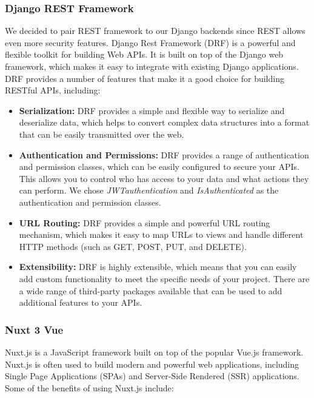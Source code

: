 \documentclass[table, 12pt]{article}
\begin{document}
\subsubsection{Django REST Framework}
\label{REST}
We decided to pair REST framework to our Django backends since REST allows even more security features.
Django Rest Framework (DRF) is a powerful and flexible toolkit for building Web APIs. It is built on top of the Django web framework, which makes it easy to integrate with existing Django applications. DRF provides a number of features that make it a good choice for building RESTful APIs, including:

\begin{itemize}
\item \textbf{Serialization:} DRF provides a simple and flexible way to serialize and deserialize data, which helps to convert complex data structures into a format that can be easily transmitted over the web.
\item \textbf{Authentication and Permissions:} DRF provides a range of authentication and permission classes, which can be easily configured to secure your APIs. This allows you to control who has access to your data and what actions they can perform. We chose \textit{JWTauthentication} and \textit{IsAuthenticated} as the authentication and permission classes.
\item \textbf{URL Routing:} DRF provides a simple and powerful URL routing mechanism, which makes it easy to map URLs to views and handle different HTTP methods (such as GET, POST, PUT, and DELETE).
\item \textbf{Extensibility:} DRF is highly extensible, which means that you can easily add custom functionality to meet the specific needs of your project. There are a wide range of third-party packages available that can be used to add additional features to your APIs.
\end{itemize}

\subsubsection{Nuxt 3 Vue}
\label{Vue}
Nuxt.js is a JavaScript framework built on top of the popular Vue.js framework. Nuxt.js is often used to build modern and powerful web applications, including Single Page Applications (SPAs) and Server-Side Rendered (SSR) applications. Some of the benefits of using Nuxt.js include:
\end{document}
